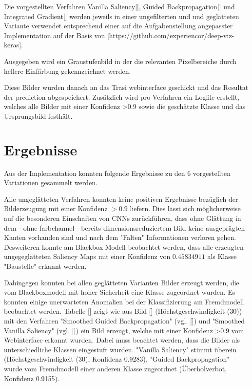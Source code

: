 Die vorgestellten Verfahren Vanilla Saliency[], Guided Backpropagation[] und Integrated Gradient[] werden jeweils in einer ungefilterten und und geglätteten Variante verwendet entsprechend einer auf die Aufgabenstellung angepasster Implementation auf der Basis von [https://github.com/experiencor/deep-viz-keras]. 

Ausgegeben wird ein Graustufenbild in der die relevanten Pixelbereiche durch hellere Einfärbung gekennzeichnet werden.

Diese Bilder wurden danach an das Trasi webinterface geschickt und das Resultat der prediction abgespeichert. Zusätzlich wird pro Verfahren ein Logfile erstellt, welches alle Bilder mit einer Konfidenz >0.9 sowie die geschätzte Klasse und das Ursprungsbild festhält.
%
%
%
%


\section{Ergebnisse}

Aus der Implementation konnten folgende Ergebnisse zu den 6 vorgestellten Variationen gesammelt werden. 

Alle ungeglätteten Verfahren konnten keine positiven Ergebnisse bezüglich der Bilderzeugung mit einer Konfidenz $> 0.9$ liefern. Dies lässt sich möglicherweise auf die besonderen Einschaften von CNNs zurückführen, dass ohne Glättung in dem - ohne farbchannel - bereits dimensionsreduziertem Bild keine ausgeprägten Kanten vorhanden sind und nach dem "Falten" Informationen verloren gehen. Desweiteren konnte am Blackbox Modell beobachtet werden, dass alle erzeugten ungegeglätteten Saliency Maps mit einer Konfidenz von $0.45834911$ als Klasse "Baustelle" erkannt werden.

Dahingegen konnten bei allen geglätteten Varianten Bilder erzeugt werden, die vom Blackboxmodell mit hoher Sicherheit eine Klasse zugeordnet wurden. Es konnten einige unerwarteten Anomalien bei der Klassifizierung am Fremdmodell beobachtet werden.  Tabelle [] zeigt wie aus Bild [] (Höchstgeschwindigkeit (30))  mit den Verfahren "Smoothed Guided Backpropagation" (vgl. []) und "Smoothed Vanilla Saliency" (vgl. []) ein Bild erzeugt, welche mit einer Konfidenz >0.9 vom Webinterface erkannt wurden. Dabei muss beachtet werden, dass die Bilder als unterschiedliche Klassen eingestuft wurden. "Vanilla Saliency" stimmt überein (Höchstgeschwindigkeit (30), Konfidenz 0.9283), "Guided Backpropagation" wurde vom Fremdmodell einer anderen Klasse zugeordnet (Überholverbot, Konfidenz 0.9155).

